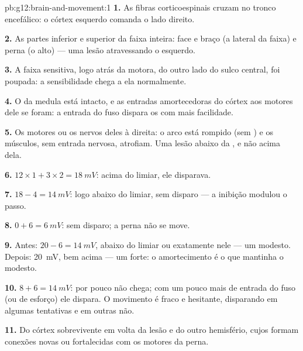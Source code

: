 \begin{solution}{pb:g12:brain-and-movement:1}
\textbf{1.} As fibras corticoespinais cruzam no tronco encefálico: o
córtex esquerdo comanda o lado direito.

\textbf{2.} As partes inferior e superior da faixa inteira: face e
braço (a lateral da faixa) e perna (o alto) --- uma lesão atravessando
o  esquerdo.

\textbf{3.} A faixa sensitiva, logo atrás da motora, do outro lado do
sulco central, foi poupada: a sensibilidade chega a ela normalmente.

\textbf{4.} O  da medula está intacto, e as entradas
amortecedoras do córtex aos  motores dele se foram: a entrada
do fuso dispara os  com mais facilidade.

\textbf{5.} Os  motores ou os nervos deles à direita: o arco
está rompido (sem ) e os músculos, sem entrada nervosa,
atrofiam. Uma lesão abaixo da , e não acima dela.

\textbf{6.} $12 \times 1 + 3 \times 2 = \qty{18}{mV}$: acima do limiar,
ele disparava.

\textbf{7.} $18 - 4 = \qty{14}{mV}$: logo abaixo do limiar, sem
disparo --- a inibição modulou o passo.

\textbf{8.} $0 + 6 = \qty{6}{mV}$: sem disparo; a perna não se move.

\textbf{9.} Antes: $20 - 6 = \qty{14}{mV}$, abaixo do limiar ou
exatamente nele --- um  modesto. Depois: \qty{20}{mV}, bem acima
--- um  forte: o amortecimento é o que mantinha o  modesto.

\textbf{10.} $8 + 6 = \qty{14}{mV}$: por pouco não chega; com um pouco
mais de entrada do fuso (ou de esforço) ele dispara. O movimento é
fraco e hesitante, disparando em algumas tentativas e em outras não.

\textbf{11.} Do córtex sobrevivente em volta da lesão e do outro
hemisfério, cujos  formam conexões novas ou fortalecidas com
os  motores da perna.


\end{solution}
